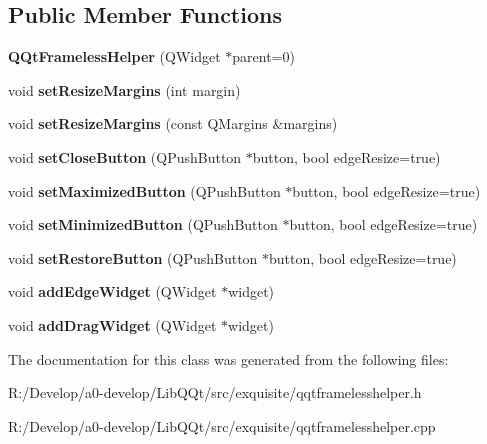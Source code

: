 \subsection*{Public Member Functions}
\begin{DoxyCompactItemize}
\item 
\mbox{\label{class_q_qt_frameless_helper_a2eba2935187e0fc02f34668f0b3d841b}} 
{\bfseries Q\+Qt\+Frameless\+Helper} (Q\+Widget $\ast$parent=0)
\item 
\mbox{\label{class_q_qt_frameless_helper_aa400d30f22fda62872f92f8c6046f0c8}} 
void {\bfseries set\+Resize\+Margins} (int margin)
\item 
\mbox{\label{class_q_qt_frameless_helper_ab2aeedbb0864c0ebbb0e5f381bdd7b80}} 
void {\bfseries set\+Resize\+Margins} (const Q\+Margins \&margins)
\item 
\mbox{\label{class_q_qt_frameless_helper_ae81a1a4996d69be806ceb4973d270025}} 
void {\bfseries set\+Close\+Button} (Q\+Push\+Button $\ast$button, bool edge\+Resize=true)
\item 
\mbox{\label{class_q_qt_frameless_helper_a8fca306726c55844f0a999b2244cfe94}} 
void {\bfseries set\+Maximized\+Button} (Q\+Push\+Button $\ast$button, bool edge\+Resize=true)
\item 
\mbox{\label{class_q_qt_frameless_helper_a72fbbcc264d89a1c85b9e80872975919}} 
void {\bfseries set\+Minimized\+Button} (Q\+Push\+Button $\ast$button, bool edge\+Resize=true)
\item 
\mbox{\label{class_q_qt_frameless_helper_a14ddfa252922cfdbcf19c42de34be9a9}} 
void {\bfseries set\+Restore\+Button} (Q\+Push\+Button $\ast$button, bool edge\+Resize=true)
\item 
\mbox{\label{class_q_qt_frameless_helper_a13560a7513fd214e8622df687fd504dd}} 
void {\bfseries add\+Edge\+Widget} (Q\+Widget $\ast$widget)
\item 
\mbox{\label{class_q_qt_frameless_helper_ac70b3d3916d83139a33f09932563dff8}} 
void {\bfseries add\+Drag\+Widget} (Q\+Widget $\ast$widget)
\end{DoxyCompactItemize}


The documentation for this class was generated from the following files\+:\begin{DoxyCompactItemize}
\item 
R\+:/\+Develop/a0-\/develop/\+Lib\+Q\+Qt/src/exquisite/qqtframelesshelper.\+h\item 
R\+:/\+Develop/a0-\/develop/\+Lib\+Q\+Qt/src/exquisite/qqtframelesshelper.\+cpp\end{DoxyCompactItemize}
